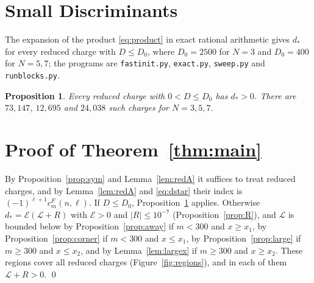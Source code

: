 \documentclass[11pt]{amsart}
\numberwithin{equation}{section}
\theoremstyle{plain}
\newtheorem{prop}[thm]{Proposition}
\theoremstyle{definition}
\theoremstyle{remark}
\newcommand{\cE}{\mathcal{E}}
\newcommand{\cL}{\mathcal{L}}
\begin{document}
\section{Small Discriminants}\label{sec:exact}

The expansion of the product \eqref{eq:product} in exact rational arithmetic gives $d_*$ for every reduced charge with $D\le D_0$, where $D_0=2500$ for $N=3$ and $D_0=400$ for $N=5,7$; the programs are \texttt{fastinit.py}, \texttt{exact.py}, \texttt{sweep.py} and \texttt{runblocks.py}.

\begin{prop}\label{prop:exact}
Every reduced charge with $0<D\le D_0$ has $d_*>0$. There are $73{,}147$, $12{,}695$ and $24{,}038$ such charges for $N=3,5,7$.
\end{prop}

\section{Proof of Theorem~\ref{thm:main}}\label{sec:proof}

By Proposition~\ref{prop:sym} and Lemma~\ref{lem:redA} it suffices to treat reduced charges, and by Lemma~\ref{lem:redA} and \eqref{eq:dstar} their index is $(-1)^{\ell+1}c^F_m(n,\ell)$. If $D\le D_0$, Proposition~\ref{prop:exact} applies. Otherwise $d_*=\cE(\cL+R)$ with $\cE>0$ and $|R|\le10^{-7}$ (Proposition~\ref{prop:R}), and $\cL$ is bounded below by Proposition~\ref{prop:away} if $m<300$ and $x\ge x_1$, by Proposition~\ref{prop:corner} if $m<300$ and $x\le x_1$, by Proposition~\ref{prop:large} if $m\ge300$ and $x\le x_2$, and by Lemma~\ref{lem:largex} if $m\ge300$ and $x\ge x_2$. These regions cover all reduced charges (Figure~\ref{fig:regions}), and in each of them $\cL+R>0$. \qed
\end{document}

